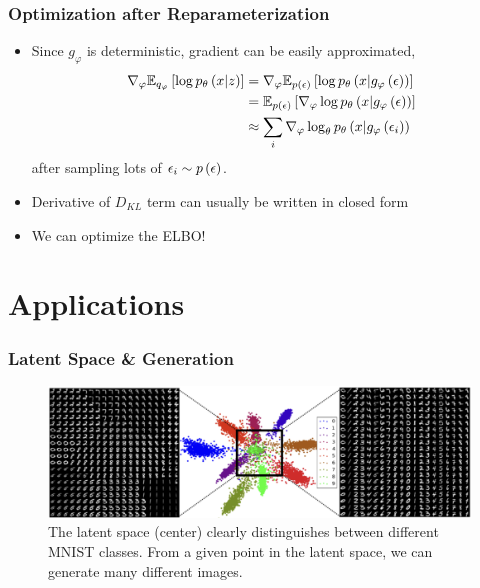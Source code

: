 \documentclass[10pt,mathserif]{beamer}
\begin{document}
\begin{frame}
  \frametitle{Optimization after Reparameterization}
  \begin{itemize}
  \item Since $g_{\varphi}$ is deterministic, gradient can be easily
    approximated,
  \begin{align*}
    \nabla_{\varphi} \mathbb{E}_{q_{\varphi}}\left[{\log p_{\theta}\left(x \vert z\right)}\right] &=
    \nabla_{\varphi} \mathbb{E}_{p\left(\epsilon\right)}\left[{\log p_{\theta}\left(x \vert g_{\varphi}\left(\epsilon\right)\right)}\right] \\
    &= \mathbb{E}_{p\left(\epsilon\right)}\left[{\nabla_{\varphi} \log p_{\theta}\left(x \vert g_{\varphi}\left(\epsilon\right)\right)}\right] \\
      &\approx \sum_{i} \nabla_{\varphi} \log_{\theta}p_{\theta}\left(x \vert g_{\varphi}\left(\epsilon_{i}\right)\right)
  \end{align*}
  after sampling lots of $\epsilon_{i} \sim p\left(\epsilon\right)$.
  \item Derivative of $D_{KL}$ term can usually be written in closed form
  \item We can optimize the ELBO!
  \end{itemize}
\end{frame}

\section{Applications}
\label{sec:applications}

\begin{frame}
  \frametitle{Latent Space \& Generation}
\begin{figure}[ht]
  \centering
  \includegraphics[width=0.8\paperwidth]{figure/vae_latent}
  \caption{The latent space (center) clearly distinguishes between different
    MNIST classes. From a given point in the latent space, we can generate many
    different images. \label{fig:vae_latent} }
\end{figure}
\end{frame}
\end{document}
